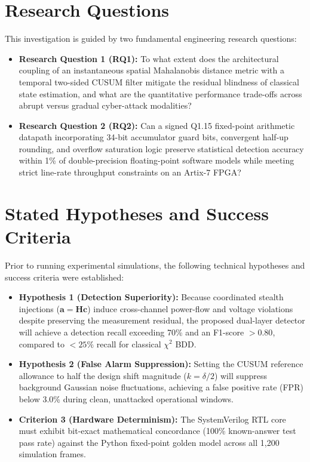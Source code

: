 \documentclass[11pt,a4paper]{report}
\begin{document}
\section{Research Questions}
This investigation is guided by two fundamental engineering research questions:
\begin{itemize}
    \item \textbf{Research Question 1 (RQ1):} To what extent does the architectural
    coupling of an instantaneous spatial Mahalanobis distance metric with a temporal
    two-sided CUSUM filter mitigate the residual blindness of classical state
    estimation, and what are the quantitative performance trade-offs across abrupt
    versus gradual cyber-attack modalities?
    \item \textbf{Research Question 2 (RQ2):} Can a signed Q1.15 fixed-point
    arithmetic datapath incorporating 34-bit accumulator guard bits, convergent
    half-up rounding, and overflow saturation logic preserve statistical detection
    accuracy within 1\% of double-precision floating-point software models while
    meeting strict line-rate throughput constraints on an Artix-7 FPGA?
\end{itemize}

\section{Stated Hypotheses and Success Criteria}
Prior to running experimental simulations, the following technical hypotheses and
success criteria were established:
\begin{itemize}
    \item \textbf{Hypothesis 1 (Detection Superiority):} Because coordinated stealth
    injections ($\boldsymbol{a} = \boldsymbol{H}\boldsymbol{c}$) induce cross-channel
    power-flow and voltage violations despite preserving the measurement residual,
    the proposed dual-layer detector will achieve a detection recall exceeding 70\%
    and an F1-score $> 0.80$, compared to $< 25\%$ recall for classical $\chi^2$ BDD.
    \item \textbf{Hypothesis 2 (False Alarm Suppression):} Setting the CUSUM reference
    allowance to half the design shift magnitude ($k = \delta/2$) will suppress
    background Gaussian noise fluctuations, achieving a false positive rate (FPR)
    below 3.0\% during clean, unattacked operational windows.
    \item \textbf{Criterion 3 (Hardware Determinism):} The SystemVerilog RTL core
    must exhibit bit-exact mathematical concordance (100\% known-answer test pass
    rate) against the Python fixed-point golden model across all 1,200 simulation frames.
\end{itemize}
\end{document}
